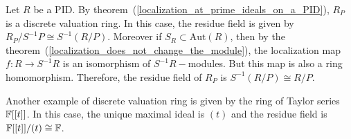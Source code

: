 \begin{dang}
    \begin{example}\label{residue_field_of_Rp}
       Let $R$ be a PID. By theorem~(\ref{localization_at_prime_ideals_on_a_PID}), $R_P$ is a discrete valuation ring. In this case, the residue field is given by $R_P/S^{-1}P\cong S^{-1}(R/P)$. Moreover if $S_R\subset\text{Aut}(R)$, then by the theorem~(\ref{localization_does_not_change_the_module}), the localization map $f:R\rightarrow S^{-1}R$ is an isomorphism of $S^{-1}R-$modules. But this map is also a ring homomorphism. Therefore, the residue field of $R_P$ is $S^{-1}(R/P)\cong R/P$.
    \end{example}
\end{dang}
\begin{dang}
    \begin{example}
        Another example of discrete valuation ring is given by the ring of Taylor series $\mathbb{F}[[t]]$. In this case, the unique maximal ideal is $(t)$ and the residue field is $\mathbb{F}[[t]]/(t)\cong \mathbb{F}$.
    \end{example}
\end{dang}
